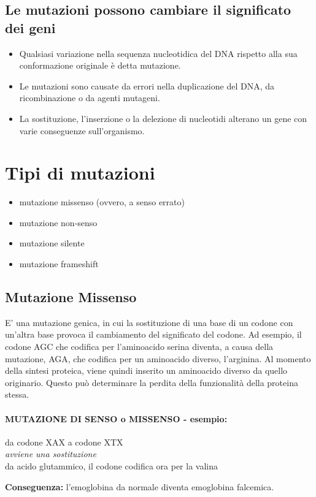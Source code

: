 \documentclass{article}
\begin{document}
\subsection{Le mutazioni possono cambiare il significato dei geni} 
\begin{itemize}
    \item Qualsiasi variazione nella sequenza nucleotidica del DNA rispetto alla sua conformazione originale è detta mutazione.
    \item Le mutazioni sono causate da errori nella duplicazione del DNA, da ricombinazione o da agenti mutageni.
    \item La sostituzione, l'inserzione o la delezione di nucleotidi alterano un gene con varie conseguenze sull'organismo.
\end{itemize}

\section{Tipi di mutazioni}
\begin{itemize}
    \item mutazione missenso (ovvero, a senso errato)
    \item mutazione non-senso
    \item mutazione silente
    \item mutazione frameshift
\end{itemize}
\subsection{Mutazione Missenso} 
E' una mutazione genica, in cui la sostituzione di una base di un codone con un'altra base provoca il cambiamento del significato del
codone. Ad esempio, il codone AGC che codifica per l'aminoacido serina diventa, a causa della mutazione, AGA, che codifica per
un aminoacido diverso, l'arginina. Al momento della sintesi proteica, viene quindi inserito un aminoacido diverso da quello originario.
Questo può determinare la perdita della funzionalità della proteina stessa.
\paragraph{MUTAZIONE DI SENSO o MISSENSO - esempio:}
\begin{center}
da codone  XAX  a codone XTX\\
\textit{avviene una sostituzione}\\
da acido glutammico, il codone codifica ora per la valina\\
\end{center}
\textbf{Conseguenza:} l'emoglobina da normale diventa emoglobina falcemica.
\end{document}
